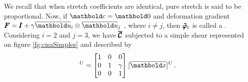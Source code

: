 \begin{example}
\begin{center}
\scalebox{.72}{}
\vspace{9pt}
\label{fg:alongPuro}
\end{center}


We recall that when stretch coefficients are identical, pure stretch is said to be proportional. Now, if $\vto{c}=\vto{0}$ and deformation gradient $\tnr{F}=\tnr{I}+\gamma\overline{\vto{u}}_i\otimes\overline{\vto{u}}_j$ , where $i\neq j$, then $\pmb{\tilde{\varphi}}_t$ is called a . Considering $i=2$ and $j=3$, we have $\pmb{\overline{\mathcal{C}}}$ subjected to a simple shear represented on figure \ref{fg:cisaSimples} and described by
\begin{equation*}
[\fua{\tnr{\tilde{\varphi}}_t}{\overline{\vto{x}}}]^U=
\begin{bmatrix}
1 & 0 & 0\\
0 & 1 & \gamma\\
0 & 0 & 1
\end{bmatrix}
[\overline{\vto{x}}]^U\,.
\end{equation*}

\begin{center}
\scalebox{.72}{}
\vspace{9pt}
\label{fg:cisaSimples}
\end{center}

\end{example}

